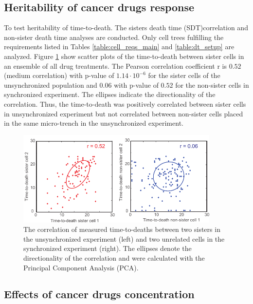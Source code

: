 \documentclass[pdftex,12pt,a4paper]{report}
\begin{document}
\subsection{Heritability of cancer drugs response}


To test heritability of time-to-death. The sisters death time (SDT)correlation and non-sister death time analyses are conducted. Only cell trees fulfilling the requirements listed in Tables \ref{table:cell_reqs_main} and \ref{table:dt_setup} are analyzed. Figure \ref{fig:image_scd} show scatter plots of the time-to-death between sister cells in an ensemble of all drug treatments. The Pearson correlation coefficient r is $0.52$ (medium correlation) with p-value of $1.14 \cdot 10^{-6}$ for the sister cells of the unsynchronized population and $0.06$ with p-value of $0.52$ for the non-sister cells in synchronized experiment. The ellipses indicate the directionality of the correlation. Thus, the time-to-death was positively correlated between sister cells in unsynchronized experiment but not correlated between non-sister cells placed in the same micro-trench in the unsynchronized experiment.

\begin{figure}[H]
\centering
\includegraphics[width=0.9\textwidth]{images/scd/scd.pdf}
\caption[The correlation of measured time-to-deaths between two sisters in the unsynchronized experiment and two unrelated cells in the synchronized experiment]{The correlation of measured time-to-deaths between two sisters in the unsynchronized experiment (left) and two unrelated cells in the synchronized experiment (right). The ellipses denote the directionality of the correlation and were calculated with the Principal Component Analysis (PCA).}
\label{fig:image_scd}
\end{figure}

\subsection{Effects of cancer drugs concentration}
\end{document}
